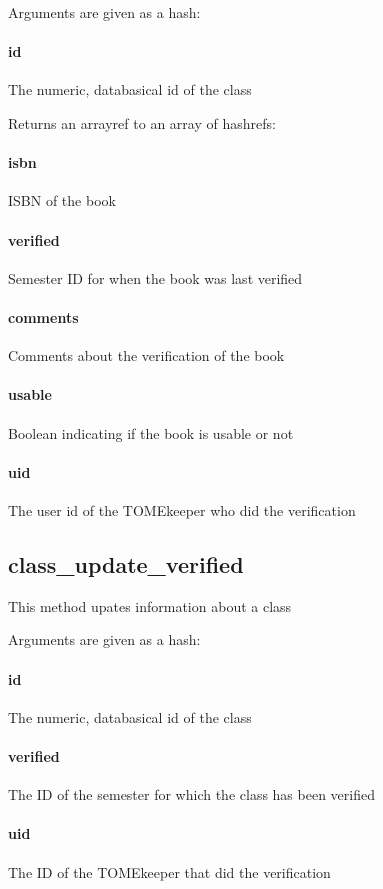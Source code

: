 \documentclass[12pt,titlepage]{article}
\begin{document}
Arguments are given as a hash:
\paragraph{id}
The numeric, databasical id of the class 

Returns an arrayref to an array of hashrefs:
\paragraph{isbn}
ISBN of the book 

\paragraph{verified}
Semester ID for when the book was last verified 

\paragraph{comments}
Comments about the verification of the book 

\paragraph{usable}
Boolean indicating if the book is usable or not 

\paragraph{uid}
The user id of the TOMEkeeper who did the verification

\subsection{class_update_verified}
This method upates information about a class

Arguments are given as a hash:
\paragraph{id}
The numeric, databasical id of the class 

\paragraph{verified}
The ID of the semester for which the class has been verified 

\paragraph{uid}
The ID of the TOMEkeeper that did the verification 
\end{document}
